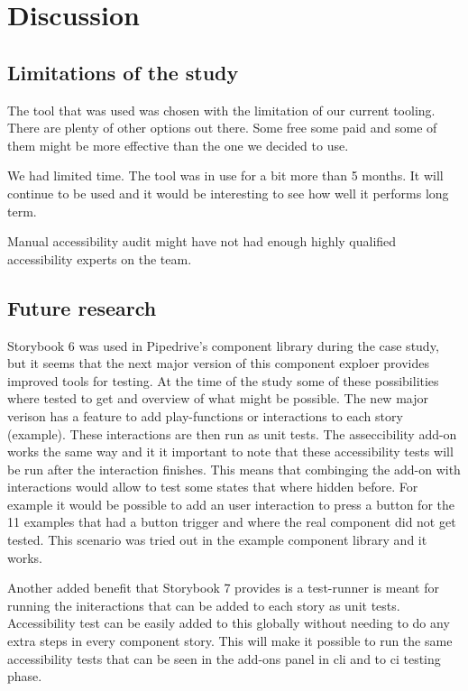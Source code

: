 \documentclass{master_thesis}
\begin{document}
\section{Discussion}

\subsection{Limitations of the study}

The tool that was used was chosen with the limitation of our current tooling. There are plenty of other options out there. Some free some paid and some of them might be more effective than the one we decided to use.

We had limited time. The tool was in use for a bit more than 5 months. It will continue to be used and it would be interesting to see how well it performs long term.

Manual accessibility audit might have not had enough highly qualified accessibility experts on the team.

\subsection{Future research}

Storybook 6 was used in Pipedrive's component library during the case study, but it seems that the next major version of this component exploer provides improved tools for testing. At the time of the study some of these possibilities where tested to get and overview of what might be possible. The new major verison has a feature to add play-functions or interactions to each story (example). These interactions are then run as unit tests. The asseccibility add-on works the same way and it it important to note that these accessibility tests will be run after the interaction finishes. This means that combinging the add-on with interactions would allow to test some states that where hidden before. For example it would be possible to add an user interaction to press a button for the 11 examples that had a button trigger and where the real component did not get tested. This scenario was tried out in the example component library and it works.

Another added benefit that Storybook 7 provides is a test-runner is meant for running the initeractions that can be added to each story as unit tests. Accessibility test can be easily added to this globally without needing to do any extra steps in every component story. This will make it possible to run the same accessibility tests that can be seen in the add-ons panel in \ac{cli} and to \ac{ci} testing phase.

\end{document}

